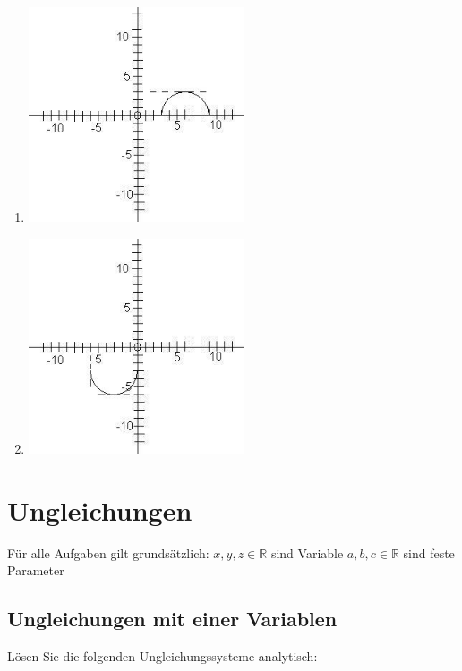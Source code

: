 \begin{enumerate}
\item
\begin{center}
\includegraphics[width=0.5\textwidth]{img/Aufgaben/Kreise/K4.jpg}
\end{center}

\item
\begin{center}
\includegraphics[width=0.5\textwidth]{img/Aufgaben/Kreise/K5.jpg}
\end{center}
\end{enumerate}

\section{Ungleichungen}

Für alle Aufgaben gilt grundsätzlich:
$ x, y, z \in \mathbb{R} $ sind Variable
$ a, b, c \in \mathbb{R} $ sind feste Parameter

\subsection{Ungleichungen mit einer Variablen}

Lösen Sie die folgenden Ungleichungssysteme analytisch:

